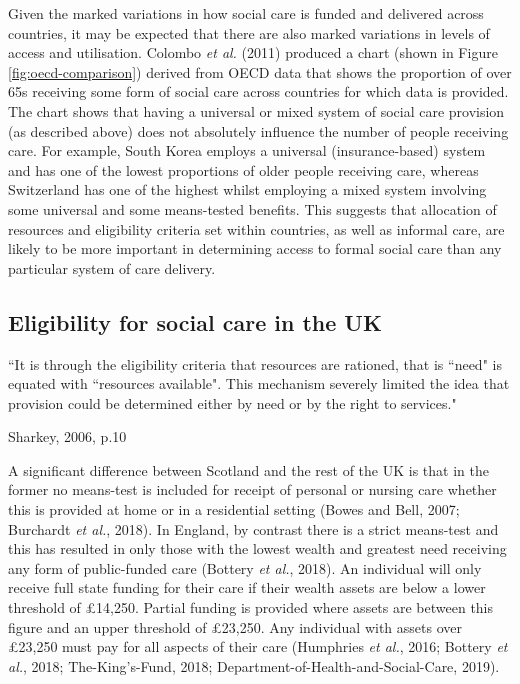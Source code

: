 \documentclass[12pt,a4paper,oneside,table]{report}
\begin{document}
Given the marked variations in how social care is funded and delivered
across countries, it may be expected that there are also marked
variations in levels of access and utilisation. Colombo \textit{et al.}
(2011) produced a chart (shown in Figure \ref{fig:oecd-comparison})
derived from OECD data that shows the proportion of over 65s receiving
some form of social care across countries for which data is provided.
The chart shows that having a universal or mixed system of social care
provision (as described above) does not absolutely influence the number
of people receiving care. For example, South Korea employs a universal
(insurance-based) system and has one of the lowest proportions of older
people receiving care, whereas Switzerland has one of the highest whilst
employing a mixed system involving some universal and some means-tested
benefits. This suggests that allocation of resources and eligibility
criteria set within countries, as well as informal care, are likely to
be more important in determining access to formal social care than any
particular system of care delivery.

\subsection{Eligibility for social care in the UK}\label{subsubsec:eligibility-uk}

\setlength{\epigraphwidth}{0.7\textwidth}

\epigraph{``It is through the eligibility criteria that resources are rationed, that is ``need" is equated with ``resources available". This mechanism severely limited the idea that provision could be determined either by need or by the right to services."}{Sharkey, 2006, p.10}

A significant difference between Scotland and the rest of the UK is that
in the former no means-test is included for receipt of personal or
nursing care whether this is provided at home or in a residential
setting (Bowes and Bell, 2007; Burchardt \emph{et al.}, 2018). In
England, by contrast there is a strict means-test and this has resulted
in only those with the lowest wealth and greatest need receiving any
form of public-funded care (Bottery \emph{et al.}, 2018). An individual
will only receive full state funding for their care if their wealth
assets are below a lower threshold of £14,250. Partial funding is
provided where assets are between this figure and an upper threshold of
£23,250. Any individual with assets over £23,250 must pay for all
aspects of their care (Humphries \emph{et al.}, 2016; Bottery \emph{et
al.}, 2018; The-King's-Fund, 2018; Department-of-Health-and-Social-Care,
2019).
\end{document}
